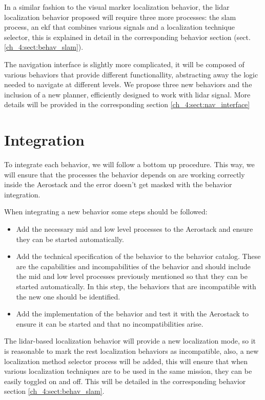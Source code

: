   In a similar fashion to the visual marker localization behavior, the lidar localization behavior proposed will require three more processes: the slam process, an ekf that combines various signals and a localization technique selector, this is explained in detail in the corresponding behavior section (sect. \ref{ch_4:sect:behav_slam}).

  The navigation interface is slightly more complicated, it will be composed of various behaviors that provide different functionallity, abstracting away the logic needed to navigate at different levels. We propose three new behaviors and the inclusion of a new planner, efficiently designed to work with lidar signal. More details will be provided in the corresponding section \ref{ch_4:sect:nav_interface}

\section{Integration} \label{ch_4:sect:integration}

  To integrate each behavior, we will follow a bottom up procedure. This way, we will ensure that the processes the behavior depends on are working correctly inside the Aerostack and the error doesn't get masked with the behavior integration.

  When integrating a new behavior some steps should be followed:
  \begin{itemize}
    \item Add the necessary mid and low level processes to the Aerostack and ensure they can be started automatically.
    \item Add the technical specification of the behavior to the behavior catalog. These are the capabilities and incompabilities of the behavior and should include the mid and low level processes previously mentioned so that they can be started automatically. In this step, the behaviors that are incompatible with the new one should be identified.
    \item Add the implementation of the behavior and test it with the Aerostack to ensure it can be started and that no incompatibilities arise.
  \end{itemize}

  The lidar-based localization behavior will provide a new localization mode, so it is reasonable to mark the rest localization behaviors as incompatible, also, a new localization method selector process will be added, this will ensure that when various localization techniques are to be used in the same mission, they can be easily toggled on and off. This will be detailed in the corresponding behavior section \ref{ch_4:sect:behav_slam}.

